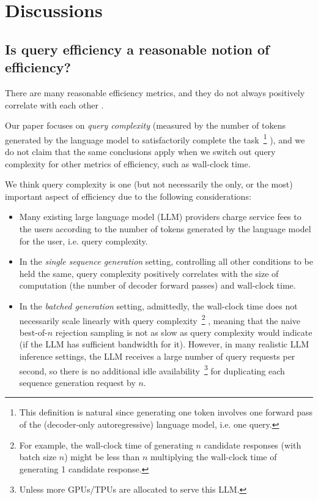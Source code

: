 \clearpage
\section{Discussions}
\label{sec:appendix:discussions}

\subsection{Is query efficiency a reasonable notion of efficiency?}

There are many reasonable efficiency metrics, and they do not always positively correlate with each other \citep{dehghani2021efficiency}.

Our paper focuses on \emph{query complexity} (measured by the number of tokens generated by the language model to satisfactorily complete the task~\footnote{
This definition is natural since generating one token involves one forward pass of the (decoder-only autoregressive) language model, i.e. one query.
}
),  and we do not claim that the same conclusions apply when we switch out query complexity for other metrics of efficiency, such as wall-clock time.

We think query complexity is one (but not necessarily the only, or the most) important aspect of efficiency due to the following considerations:
\begin{itemize}
    \item Many existing large language model (LLM) providers charge service fees to the users according to the number of tokens generated by the language model for the user, i.e. query complexity.
    \item In the \emph{single sequence generation} setting, 
    controlling all other conditions to be held the same, 
    query complexity positively correlates with the size of computation (the number of decoder forward passes) and wall-clock time.
    \item In the \emph{batched generation} setting, admittedly, the wall-clock time does not necessarily scale linearly with query complexity~\footnote{
    For example, the wall-clock time of generating $n$ candidate responses (with batch size $n$) might be less than $n$ multiplying the wall-clock time of generating 1 candidate response.
    }
    , meaning that the naive best-of-$n$ rejection sampling is not as slow as query complexity would indicate
    (if the LLM has sufficient bandwidth for it).
    However, in many realistic LLM inference settings,
    the LLM receives a large number of query requests per second, 
    so there is no additional idle availability~\footnote{
    Unless more GPUs/TPUs are allocated to serve this LLM.
    } 
    for duplicating each sequence generation request by $n$.
\end{itemize}

